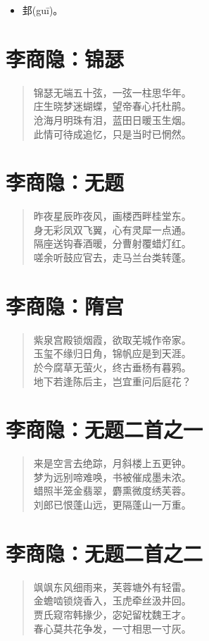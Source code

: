 \documentclass[12pt,oneside]{book}
\newenvironment{shici}{
\begin{verse}
\centering\large\hspace{12pt}}
{\end{verse}}
\begin{document}
\begin{itemize}
\item 邽(guī)。
\end{itemize}

\chapter{李商隐：锦瑟}
\begin{shici}
锦瑟无端五十弦，一弦一柱思华年。\\
庄生晓梦迷蝴蝶，望帝春心托杜鹃。\\
沧海月明珠有泪，蓝田日暖玉生烟。\\
此情可待成追忆，只是当时已惘然。
\end{shici}

\chapter{李商隐：无题}
\begin{shici}
昨夜星辰昨夜风，画楼西畔桂堂东。\\
身无彩凤双飞翼，心有灵犀一点通。\\
隔座送钩春酒暖，分曹射覆蜡灯红。\\
嗟余听鼓应官去，走马兰台类转蓬。
\end{shici}

\chapter{李商隐：隋宫}
\begin{shici}
紫泉宫殿锁烟霞，欲取芜城作帝家。\\
玉玺不缘归日角，锦帆应是到天涯。\\
於今腐草无萤火，终古垂杨有暮鸦。\\
地下若逢陈后主，岂宜重问后庭花？
\end{shici}

\chapter{李商隐：无题二首之一}
\begin{shici}
来是空言去绝踪，月斜楼上五更钟。\\
梦为远别啼难唤，书被催成墨未浓。\\
蜡照半笼金翡翠，麝熏微度绣芙蓉。\\
刘郎已恨蓬山远，更隔蓬山一万重。
\end{shici}

\chapter{李商隐：无题二首之二}
\begin{shici}
飒飒东风细雨来，芙蓉塘外有轻雷。\\
金蟾啮锁烧香入，玉虎牵丝汲井回。\\
贾氏窥帘韩掾少，宓妃留枕魏王才。\\
春心莫共花争发，一寸相思一寸灰。
\end{shici}
\end{document}
